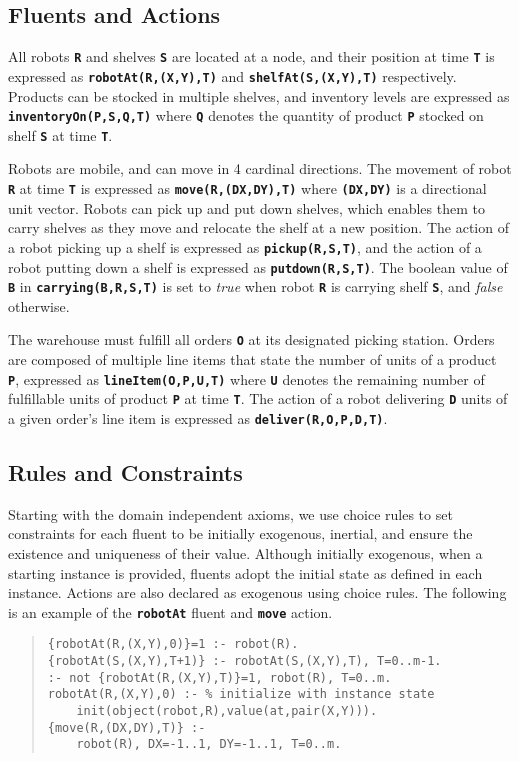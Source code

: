 \documentclass[letterpaper]{article}
\newcommand{\ct}[1]{\texttt{\textbf{#1}}}
\begin{document}
\subsection{Fluents and Actions}

All robots \ct{R} and shelves \ct{S} are located at a node, and their position at time \ct{T} is expressed as \ct{robotAt(R,(X,Y),T)} and \ct{shelfAt(S,(X,Y),T)} respectively. Products can be stocked in multiple shelves, and inventory levels are expressed as \ct{inventoryOn(P,S,Q,T)} where \ct{Q} denotes the quantity of product \ct{P} stocked on shelf \ct{S} at time \ct{T}.

Robots are mobile, and can move in 4 cardinal directions. The movement of robot \ct{R} at time \ct{T} is expressed as \ct{move(R,(DX,DY),T)} where \ct{(DX,DY)} is a directional unit vector. Robots can pick up and put down shelves, which enables them to carry shelves as they move and relocate the shelf at a new position. The action of a robot picking up a shelf is expressed as \ct{pickup(R,S,T)}, and the action of a robot putting down a shelf is expressed as \ct{putdown(R,S,T)}. The boolean value of \ct{B} in \ct{carrying(B,R,S,T)} is set to \emph{true} when robot \ct{R} is carrying shelf \ct{S}, and \emph{false} otherwise.

The warehouse must fulfill all orders \ct{O} at its designated picking station. Orders are composed of multiple line items that state the number of units of a product \ct{P}, expressed as \ct{lineItem(O,P,U,T)} where \ct{U} denotes the remaining number of fulfillable units of product \ct{P} at time \ct{T}. The action of a robot delivering \ct{D} units of a given order's line item is expressed as \ct{deliver(R,O,P,D,T)}.

\subsection{Rules and Constraints}

Starting with the domain independent axioms, we use choice rules to set constraints for each fluent to be initially exogenous, inertial, and ensure the existence and uniqueness of their value. Although initially exogenous, when a starting instance is provided, fluents adopt the initial state as defined in each instance. Actions are also declared as exogenous using choice rules. The following is an example of the \ct{robotAt} fluent and \ct{move} action.

\begin{quote}\begin{scriptsize}\begin{verbatim}
{robotAt(R,(X,Y),0)}=1 :- robot(R).
{robotAt(S,(X,Y),T+1)} :- robotAt(S,(X,Y),T), T=0..m-1.
:- not {robotAt(R,(X,Y),T)}=1, robot(R), T=0..m.
robotAt(R,(X,Y),0) :- % initialize with instance state
    init(object(robot,R),value(at,pair(X,Y))).
{move(R,(DX,DY),T)} :-
    robot(R), DX=-1..1, DY=-1..1, T=0..m.
\end{verbatim}\end{scriptsize}\end{quote}
\end{document}
